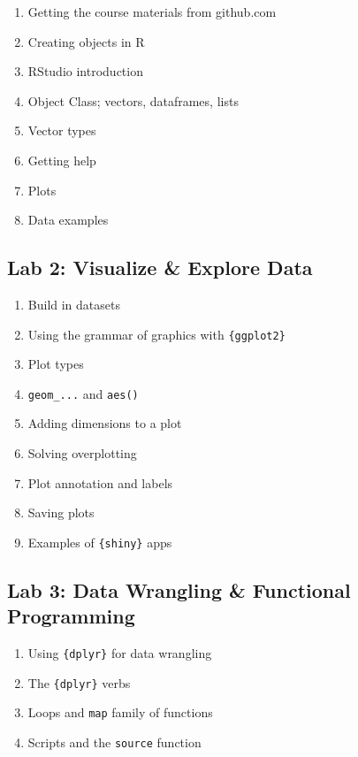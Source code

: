 \documentclass[]{book}
\providecommand{\tightlist}{%
  \setlength{\itemsep}{0pt}\setlength{\parskip}{0pt}}
\begin{document}
\begin{enumerate}
\def\labelenumi{\arabic{enumi}.}
\tightlist
\item
  Getting the course materials from github.com
\item
  Creating objects in R
\item
  RStudio introduction
\item
  Object Class; vectors, dataframes, lists
\item
  Vector types
\item
  Getting help
\item
  Plots
\item
  Data examples
\end{enumerate}

\hypertarget{lab-2-visualize-explore-data}{%
\subsection{Lab 2: Visualize \& Explore Data}\label{lab-2-visualize-explore-data}}

\begin{enumerate}
\def\labelenumi{\arabic{enumi}.}
\tightlist
\item
  Build in datasets
\item
  Using the grammar of graphics with \texttt{\{ggplot2\}}
\item
  Plot types
\item
  \texttt{geom\_...} and \texttt{aes()}
\item
  Adding dimensions to a plot
\item
  Solving overplotting
\item
  Plot annotation and labels
\item
  Saving plots
\item
  Examples of \texttt{\{shiny\}} apps
\end{enumerate}

\hypertarget{lab-3-data-wrangling-functional-programming}{%
\subsection{Lab 3: Data Wrangling \& Functional Programming}\label{lab-3-data-wrangling-functional-programming}}

\begin{enumerate}
\def\labelenumi{\arabic{enumi}.}
\tightlist
\item
  Using \texttt{\{dplyr\}} for data wrangling
\item
  The \texttt{\{dplyr\}} verbs
\item
  Loops and \texttt{map} family of functions
\item
  Scripts and the \texttt{source} function
\end{enumerate}
\end{document}
